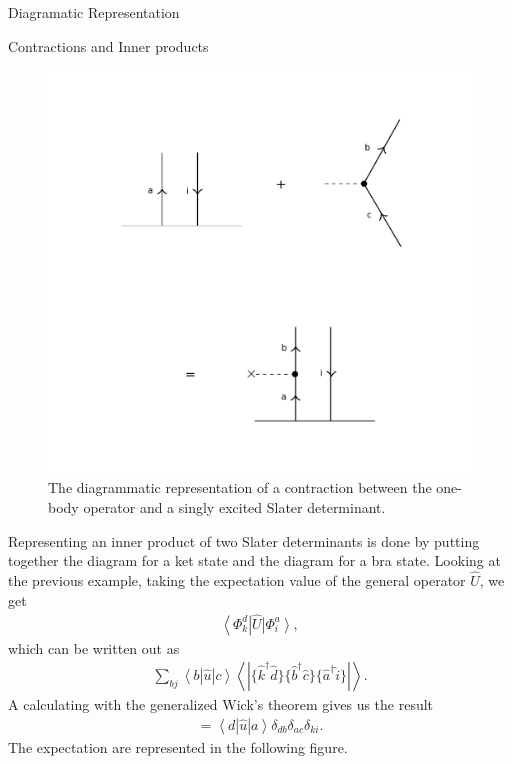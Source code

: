 \documentclass[twoside,english]{uiofysmaster}
\begin{document}
\begin{chapter}{Diagramatic Representation}
\begin{section}{Contractions and Inner products}
\begin{figure}[H]
			\includegraphics[width=\textwidth]{Figures/Contraction.pdf}
			\caption{The diagrammatic representation of a contraction between the  one-body operator and a singly excited Slater determinant.}
			\label{Contraction}
		\end{figure}
		Representing an inner product of two Slater determinants is done by putting together the diagram for a ket state and the diagram for a bra state. Looking at the previous example, taking the expectation value of the general operator $\hat U$, we get 
		\begin{align}
			\left< \Phi_k^d \right| \hat U \left| \Phi_i^a \right>,
		\end{align}
		which can be written out as
		\begin{align}
			\sum_{bj} \left< b | \hat u | c \right> \left< \right. | \{ \hat k^\dagger \hat d \} \{ \hat b^\dagger \hat c \} \{ \hat a^\dagger \hat i \} | \left. \right>.
		\end{align}
		A calculating with the generalized Wick's theorem gives us the result
		\begin{align}
			= \left< d | \hat u | a \right> \delta_{db} \delta_{ac} \delta_{ki}.
		\end{align}
		The expectation are represented in the following figure. 
		\begin{figure}[H]

\end{figure}
\end{section}
\end{chapter}
\end{document}
